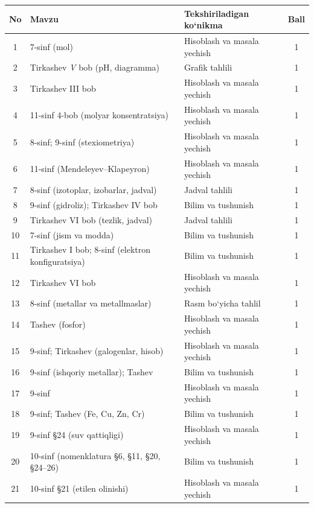 \documentclass[11pt,a4paper]{article}
\begin{document}
{\small\noindent\begin{longtable}{|c|p{7.2cm}|p{5.4cm}|c|}\hline \textbf{No} & \textbf{Mavzu} & \textbf{Tekshiriladigan ko`nikma} & \textbf{Ball}\\\hline
1 & 7-sinf (mol) & Hisoblash va masala yechish & 1\\\hline
2 & Tirkashev \textit{V} bob (pH, diagramma) & Grafik tahlili & 1\\\hline
3 & Tirkashev III bob & Hisoblash va masala yechish & 1\\\hline
4 & 11-sinf 4-bob (molyar konsentratsiya) & Hisoblash va masala yechish & 1\\\hline
5 & 8-sinf; 9-sinf (stexiometriya) & Hisoblash va masala yechish & 1\\\hline
6 & 11-sinf (Mendeleyev--Klapeyron) & Hisoblash va masala yechish & 1\\\hline
7 & 8-sinf (izotoplar, izobarlar, jadval) & Jadval tahlili & 1\\\hline
8 & 9-sinf (gidroliz); Tirkashev IV bob & Bilim va tushunish & 1\\\hline
9 & Tirkashev VI bob (tezlik, jadval) & Jadval tahlili & 1\\\hline
10 & 7-sinf (jism va modda) & Bilim va tushunish & 1\\\hline
11 & Tirkashev I bob; 8-sinf (elektron konfiguratsiya) & Bilim va tushunish & 1\\\hline
12 & Tirkashev VI bob & Hisoblash va masala yechish & 1\\\hline
13 & 8-sinf (metallar va metallmaslar) & Rasm bo`yicha tahlil & 1\\\hline
14 & Tashev (fosfor) & Hisoblash va masala yechish & 1\\\hline
15 & 9-sinf; Tirkashev (galogenlar, hisob) & Hisoblash va masala yechish & 1\\\hline
16 & 9-sinf (ishqoriy metallar); Tashev & Bilim va tushunish & 1\\\hline
17 & 9-sinf & Hisoblash va masala yechish & 1\\\hline
18 & 9-sinf; Tashev (Fe, Cu, Zn, Cr) & Bilim va tushunish & 1\\\hline
19 & 9-sinf \S{}24 (suv qattiqligi) & Hisoblash va masala yechish & 1\\\hline
20 & 10-sinf (nomenklatura \S{}6, \S{}11, \S{}20, \S{}24--26) & Bilim va tushunish & 1\\\hline
21 & 10-sinf \S{}21 (etilen olinishi) & Hisoblash va masala yechish & 1\\\hline

\end{longtable}}
\end{document}
